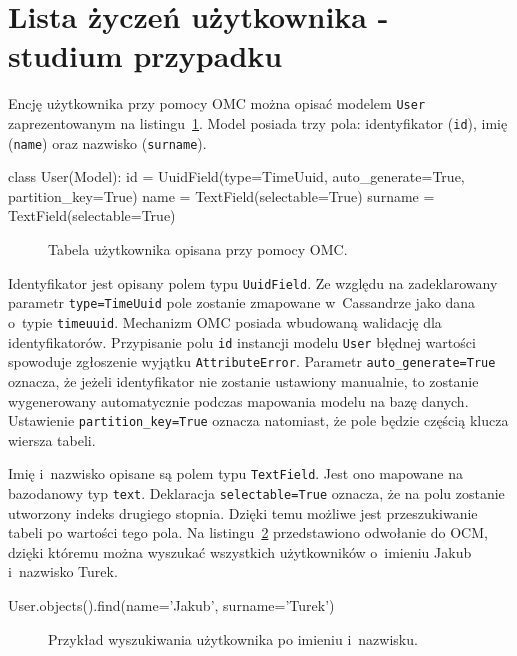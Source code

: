 \section{Lista życzeń użytkownika - studium przypadku}

Encję użytkownika przy pomocy OMC można opisać modelem \verb+User+ zaprezentowanym na listingu~\ref{lst:omc_user_definition}. Model posiada trzy pola: identyfikator (\verb+id+), imię (\verb+name+) oraz nazwisko (\verb+surname+).

\begin{verbbox}
class User(Model):
    id = UuidField(type=TimeUuid, auto_generate=True, partition_key=True)
    name = TextField(selectable=True)
    surname = TextField(selectable=True)
\end{verbbox}

\begin{figure}[ht!]
	\centering
	\theverbbox
	\caption{Tabela użytkownika opisana przy pomocy OMC.}
	\label{lst:omc_user_definition}
\end{figure}

Identyfikator jest opisany polem typu \verb+UuidField+. Ze względu na zadeklarowany parametr \verb+type=TimeUuid+ pole zostanie zmapowane w~Cassandrze jako dana o~typie \verb+timeuuid+. Mechanizm OMC posiada wbudowaną walidację dla identyfikatorów. Przypisanie polu \verb+id+ instancji modelu \verb+User+ błędnej wartości spowoduje zgłoszenie wyjątku \verb+AttributeError+. Parametr \verb+auto_generate=True+ oznacza, że jeżeli identyfikator nie zostanie ustawiony manualnie, to zostanie wygenerowany automatycznie podczas mapowania modelu na bazę danych. Ustawienie \verb+partition_key=True+ oznacza natomiast, że pole będzie częścią klucza wiersza tabeli. 

Imię i~nazwisko opisane są polem typu \verb+TextField+. Jest ono mapowane na bazodanowy typ \verb+text+. Deklaracja \verb+selectable=True+ oznacza, że na polu zostanie utworzony indeks drugiego stopnia. Dzięki temu możliwe jest przeszukiwanie tabeli po wartości tego pola. Na listingu~\ref{lst:user_search_by_name_surname} przedstawiono odwołanie do OCM, dzięki któremu można wyszukać wszystkich użytkowników o~imieniu Jakub i~nazwisko Turek.

\begin{verbbox}
	User.objects().find(name='Jakub', surname='Turek')
\end{verbbox}

\begin{figure}[ht!]
	\centering
	\theverbbox
	\caption{Przykład wyszukiwania użytkownika po imieniu i~nazwisku.}
	\label{lst:user_search_by_name_surname}
\end{figure}

